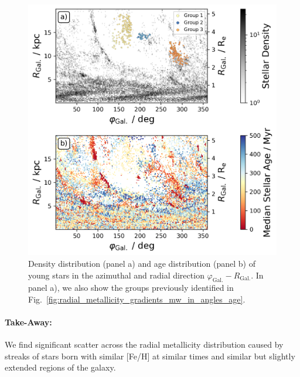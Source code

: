 \documentclass[fleqn,usenatbib]{mnras}
\begin{document}
\begin{figure}
    \centering
    \includegraphics[width=\columnwidth]{figures/phi_angle_R_follow_up.png}
    \caption{Density distribution (panel a) and age distribution (panel b) of young stars in the azimuthal and radial direction $\varphi_\mathrm{Gal.}-R_\mathrm{Gal.}$. In panel a), we also show the groups previously identified in Fig.~\ref{fig:radial_metallicity_gradients_mw_in_angles_age}.}
    \label{fig:phi_angle_R_follow_up}
\end{figure}

\paragraph*{Take-Away:} We find significant scatter across the radial metallicity distribution caused by streaks of stars born with similar [Fe/H] at similar times and similar but slightly extended regions of the galaxy.
\end{document}
